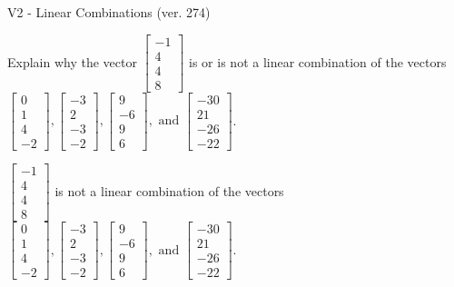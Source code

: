 \begin{exercise}
  \begin{exerciseTitle}V2 - Linear Combinations (ver. 274)\end{exerciseTitle}
  \begin{exerciseStatement}
    Explain why the vector \(\left[\begin{array}{c}
-1 \\
4 \\
4 \\
8
\end{array}\right]\)  is or is not a linear 
	combination of the vectors \(\left[\begin{array}{c}
0 \\
1 \\
4 \\
-2
\end{array}\right] , \left[\begin{array}{c}
-3 \\
2 \\
-3 \\
-2
\end{array}\right] , \left[\begin{array}{c}
9 \\
-6 \\
9 \\
6
\end{array}\right] , \text{ and } \left[\begin{array}{c}
-30 \\
21 \\
-26 \\
-22
\end{array}\right]\).
	


  \end{exerciseStatement}
  \begin{exerciseAnswer}
   \(\left[\begin{array}{c}
-1 \\
4 \\
4 \\
8
\end{array}\right]\) 
  	 is not  
	a linear combination of the vectors \(\left[\begin{array}{c}
0 \\
1 \\
4 \\
-2
\end{array}\right] , \left[\begin{array}{c}
-3 \\
2 \\
-3 \\
-2
\end{array}\right] , \left[\begin{array}{c}
9 \\
-6 \\
9 \\
6
\end{array}\right] , \text{ and } \left[\begin{array}{c}
-30 \\
21 \\
-26 \\
-22
\end{array}\right]\).


\end{exerciseAnswer}
\end{exercise}
